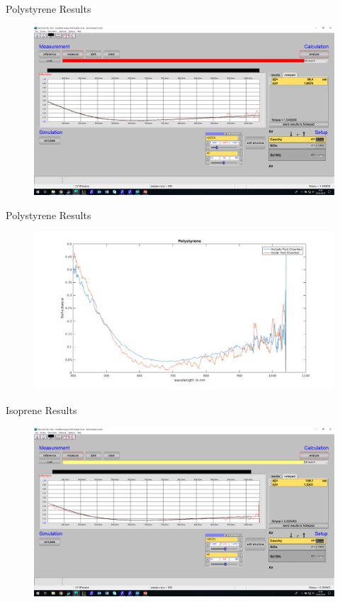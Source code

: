 \documentclass[10pt]{beamer}
\begin{document}
	\begin{frame}{Polystyrene Results}
		\begin{figure}
		\centering
		\includegraphics[width=\textwidth]{p2.png}
		\end{figure}
	\end{frame}
	
	\begin{frame}{Polystyrene Results}
		\begin{figure}
		\centering
		\includegraphics[width=\textwidth]{p3.png}
		\end{figure}
		\end{frame}
		
		\begin{frame}{Isoprene Results}
				\begin{figure}
				\centering
				\includegraphics[width=\textwidth]{i1.png}
				\end{figure}
				\end{frame}
				
\end{document}
